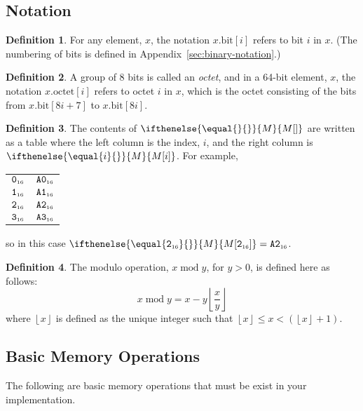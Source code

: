\documentclass[a4paper,12pt]{article}
\makeatletter
\newcommand{\num}[1]{\texttt{#1}}
\newcommand{\hex}[1]{\num{#1}_{\textup{\tiny 16}}}
\newcommand{\MEM}[1]{\ifthenelse{\equal{#1}{}}{M}{M[#1]}}
\newcommand{\octno}[2]{#1.\mathrm{octet}[#2]}
\newcommand{\bitno}[2]{#1.\mathrm{bit}[#2]}
\DeclareMathOperator{\MOD}{mod}
\newcommand{\modulo}[2]{#1 \MOD #2}
\theoremstyle{definition}
\newtheorem{definition}{Definition}
\newenvironment{memtable}{%
  \begin{trivlist}
    \item
    }{%
    \end{trivlist}}
\newenvironment{memcolumn}{%
  \begin{tabular}{@{}ll@{}}
    \hline}
    {%
    \hline
  \end{tabular}}
\makeatother
\begin{document}
\subsection{Notation}

\begin{definition}
For any element, $x$, the notation $\bitno{x}{i}$ refers to bit $i$ in $x$. (The numbering of bits is defined in Appendix~\ref{sec:binary-notation}.)
\end{definition}

\begin{definition}
A group of 8 bits is called an \emph{octet}, and in a 64-bit element, $x$, the notation $\octno{x}{i}$ refers to octet $i$ in $x$, which is the octet consisting of the bits from $\bitno{x}{8i+7}$ to $\bitno{x}{8i}$.
\end{definition}

\begin{definition}
The contents of $\MEM{}$ are written as a table where the left column is the index, $i$, and the right column is $\MEM{i}$.  For example,
\begin{memtable}
  \begin{memcolumn}
    $\hex{0}$ & $\hex{A0}$ \\
    $\hex{1}$ & $\hex{A1}$ \\
    $\hex{2}$ & $\hex{A2}$ \\
    $\hex{3}$ & $\hex{A3}$ \\
  \end{memcolumn}
\end{memtable}
so in this case $\MEM{\hex{2}} = \hex{A2}$.
\end{definition}

\begin{definition}
The modulo operation, $\modulo{x}{y}$, for $y>0$, is defined here as follows:
\[ \modulo{x}{y} = x - y \left \lfloor \frac{x}{y} \right \rfloor \]
where $\left \lfloor x \right \rfloor$ is defined as the unique integer such that $\left \lfloor x \right \rfloor \le x < (\left \lfloor x \right \rfloor + 1)$.
\end{definition}

\subsection{Basic Memory Operations}
\label{sec:memory-operations}

The following are basic memory operations that must be exist in your implementation.
\end{document}

